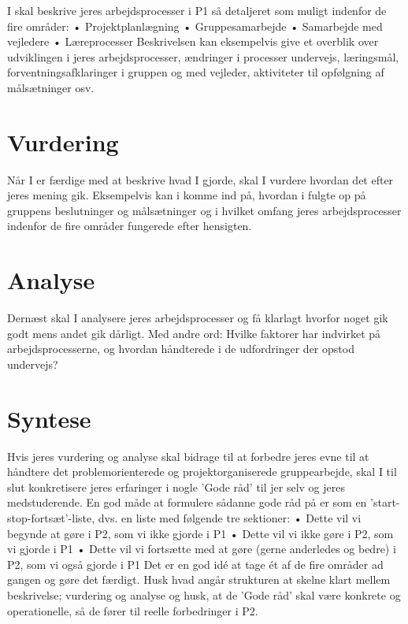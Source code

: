 I skal beskrive jeres arbejdsprocesser i P1 s\aa{} detaljeret som muligt indenfor de fire omr\aa{}der:
    •   Projektplanl\ae{}gning
    •   Gruppesamarbejde
    •   Samarbejde med vejledere
    •   L\ae{}reprocesser
Beskrivelsen kan eksempelvis give et overblik over udviklingen i jeres arbejdsprocesser, \ae{}ndringer
i processer undervejs, l\ae{}ringsm\aa{}l, forventningsafklaringer i gruppen og med vejleder, aktiviteter til
opf\o{}lgning af m\aa{}ls\ae{}tninger osv.


\section{Vurdering}

N\aa{}r I er f\ae{}rdige med at beskrive hvad I gjorde, skal I vurdere hvordan det efter jeres mening gik.
Eksempelvis kan i komme ind p\aa{}, hvordan i fulgte op p\aa{} gruppens beslutninger og m\aa{}ls\ae{}tninger og
i hvilket omfang jeres arbejdsprocesser indenfor de fire omr\aa{}der fungerede efter hensigten.


\section{Analyse}

Dern\ae{}st skal I analysere jeres arbejdsprocesser og f\aa{} klarlagt hvorfor noget gik godt mens andet gik
d\aa{}rligt. Med andre ord: Hvilke faktorer har indvirket p\aa{} arbejdsprocesserne, og hvordan h\aa{}ndterede
i de udfordringer der opstod undervejs?


\section{Syntese}

Hvis jeres vurdering og analyse skal bidrage til at forbedre jeres evne til at h\aa{}ndtere det
problemorienterede og projektorganiserede gruppearbejde, skal I til slut konkretisere jeres
erfaringer i nogle ’Gode r\aa{}d’ til jer selv og jeres medstuderende. En god m\aa{}de at formulere s\aa{}danne
gode r\aa{}d p\aa{} er som en ’start-stop-forts\ae{}t’-liste, dvs. en liste med f\o{}lgende tre sektioner:
    •   Dette vil vi begynde at g\o{}re i P2, som vi ikke gjorde i P1
    •   Dette vil vi ikke g\o{}re i P2, som vi gjorde i P1
    •   Dette vil vi forts\ae{}tte med at g\o{}re (gerne anderledes og bedre) i P2, som vi ogs\aa{} gjorde i P1
Det er en god idé at tage ét af de fire omr\aa{}der ad gangen og g\o{}re det f\ae{}rdigt. Husk hvad ang\aa{}r
strukturen at skelne klart mellem beskrivelse; vurdering og analyse og husk, at de ’Gode r\aa{}d’ skal
v\ae{}re konkrete og operationelle, s\aa{} de f\o{}rer til reelle forbedringer i P2.
